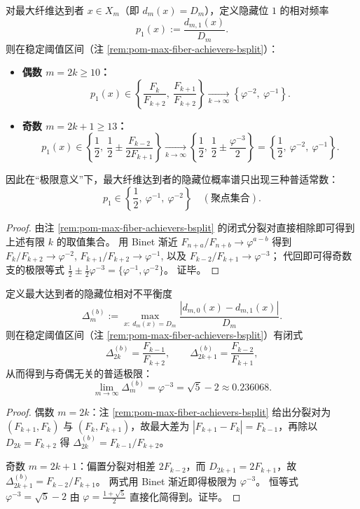 \begin{corollary}\label{cor:pom-max-fiber-achievers-hidden-bit-prob-spectrum}
对最大纤维达到者 \(x\in X_m\)（即 \(d_m(x)=D_m\)），定义隐藏位 \(1\) 的相对频率
\[
p_1(x):=\frac{d_{m,1}(x)}{D_m}.
\]
则在稳定阈值区间（注 \ref{rem:pom-max-fiber-achievers-bsplit}）：
\begin{itemize}
  \item \textbf{偶数 \(m=2k\ge 10\)：}
  \[
  p_1(x)\in\left\{\frac{F_k}{F_{k+2}},\ \frac{F_{k+1}}{F_{k+2}}\right\}
  \xrightarrow[k\to\infty]{}\left\{\varphi^{-2},\ \varphi^{-1}\right\}.
  \]
  \item \textbf{奇数 \(m=2k+1\ge 13\)：}
  \[
  p_1(x)\in\left\{\frac12,\ \frac12\pm\frac{F_{k-2}}{2F_{k+1}}\right\}
  \xrightarrow[k\to\infty]{}\left\{\frac12,\ \frac12\pm\frac{\varphi^{-3}}{2}\right\}
  =
  \left\{\frac12,\ \varphi^{-2},\ \varphi^{-1}\right\}.
  \]
\end{itemize}
因此在“极限意义”下，最大纤维达到者的隐藏位概率谱只出现三种普适常数：
\[
\boxed{\;
p_1\in\left\{\frac12,\ \varphi^{-1},\ \varphi^{-2}\right\}\quad(\text{聚点集合}).
\;}
\]
\end{corollary}
\begin{proof}
由注 \ref{rem:pom-max-fiber-achievers-bsplit} 的闭式分裂对直接相除即可得到上述有限 \(k\) 的取值集合。
用 Binet 渐近 \(F_{n+a}/F_{n+b}\to \varphi^{a-b}\) 得到
\(
F_k/F_{k+2}\to\varphi^{-2}
\),
\(
F_{k+1}/F_{k+2}\to\varphi^{-1}
\),
以及
\(
F_{k-2}/F_{k+1}\to\varphi^{-3}
\)；
代回即可得奇数支的极限等式
\(
\tfrac12\pm\tfrac12\varphi^{-3}=\{\varphi^{-1},\varphi^{-2}\}
\)。
证毕。
\end{proof}

\begin{corollary}\label{cor:pom-max-fiber-achievers-hidden-bit-imbalance}
定义最大达到者的隐藏位相对不平衡度
\[
\Delta_m^{(b)}:=\max_{x:\ d_m(x)=D_m}\frac{|d_{m,0}(x)-d_{m,1}(x)|}{D_m}.
\]
则在稳定阈值区间（注 \ref{rem:pom-max-fiber-achievers-bsplit}）有闭式
\[
\Delta_{2k}^{(b)}=\frac{F_{k-1}}{F_{k+2}},
\qquad
\Delta_{2k+1}^{(b)}=\frac{F_{k-2}}{F_{k+1}},
\]
从而得到与奇偶无关的普适极限：
\[
\boxed{\;
\lim_{m\to\infty}\Delta_m^{(b)}=\varphi^{-3}=\sqrt5-2\approx 0.236068.
\;}
\]
\end{corollary}
\begin{proof}
偶数 \(m=2k\)：注 \ref{rem:pom-max-fiber-achievers-bsplit} 给出分裂对为 \((F_{k+1},F_k)\) 与 \((F_k,F_{k+1})\)，故最大差为 \(|F_{k+1}-F_k|=F_{k-1}\)，再除以 \(D_{2k}=F_{k+2}\) 得 \(\Delta_{2k}^{(b)}=F_{k-1}/F_{k+2}\)。
\par
奇数 \(m=2k+1\)：偏置分裂对相差 \(2F_{k-2}\)，而 \(D_{2k+1}=2F_{k+1}\)，故 \(\Delta_{2k+1}^{(b)}=F_{k-2}/F_{k+1}\)。
两式用 Binet 渐近即得极限为 \(\varphi^{-3}\)。
恒等式 \(\varphi^{-3}=\sqrt5-2\) 由 \(\varphi=\frac{1+\sqrt5}{2}\) 直接化简得到。证毕。
\end{proof}

